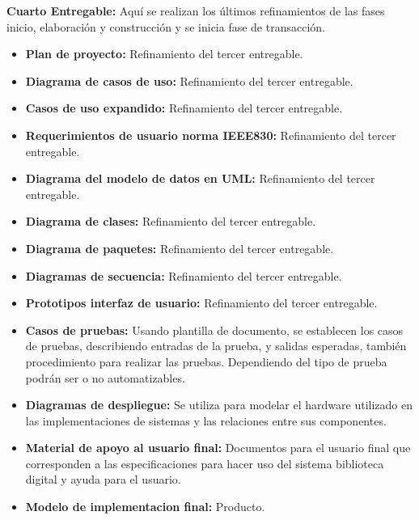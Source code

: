                 \textbf{Cuarto Entregable:} Aquí se realizan los últimos refinamientos de las fases
                inicio, elaboración y construcción y se inicia fase de transacción.
                
                \begin{itemize}
                \item\textbf{Plan de proyecto:} Refinamiento del tercer entregable.
                \item\textbf{Diagrama de casos de uso:} Refinamiento del tercer entregable.
                \item\textbf{Casos de uso expandido:} Refinamiento del tercer entregable.
                \item\textbf{Requerimientos de usuario norma IEEE830:} Refinamiento del tercer
                entregable.
                \item\textbf{Diagrama del modelo de datos en UML:} Refinamiento del tercer
                entregable.                
                \item\textbf{Diagrama de clases:} Refinamiento del tercer entregable.
                \item\textbf{Diagrama de paquetes:} Refinamiento del tercer entregable.
                \item\textbf{Diagramas de secuencia:} Refinamiento del tercer entregable.
                \item\textbf{Prototipos interfaz de usuario:} Refinamiento del tercer entregable.
                \item\textbf{Casos de pruebas:} Usando plantilla de documento, se establecen los
                casos de pruebas, describiendo entradas de la prueba, y salidas esperadas, también
                procedimiento para realizar las pruebas. Dependiendo del tipo de prueba podrán ser
                o no automatizables. 
                \item\textbf{Diagramas de despliegue:} Se utiliza para modelar el hardware 
                utilizado en las implementaciones de sistemas y las relaciones entre sus
                componentes.                
                \item\textbf{Material de apoyo al usuario final:} Documentos para el usuario final
                que corresponden a las especificaciones para hacer uso del sistema biblioteca
                digital y ayuda para el usuario.
                \item\textbf{Modelo de implementacion final:} Producto.
                \end{itemize}
                

